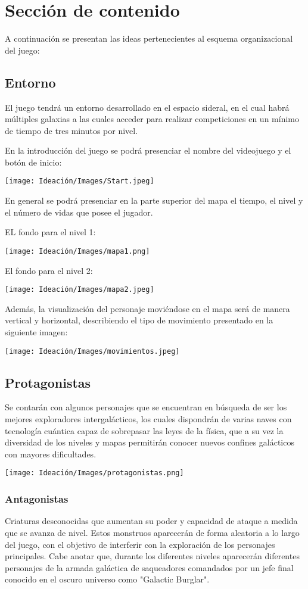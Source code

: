 \documentclass{article}
\begin{document}
\section{Sección de contenido} \label{contenido}
A continuación se presentan las ideas pertenecientes al esquema organizacional del juego:

\subsection{Entorno}
El juego tendrá un entorno desarrollado en el espacio sideral, en el cual habrá múltiples galaxias a las cuales acceder para realizar competiciones en un mínimo de tiempo de tres minutos por nivel. 

En la introducción del juego se podrá presenciar el nombre del videojuego y el botón de inicio:


\texttt{[image: Ideación/Images/Start.jpeg]}


En general se podrá presenciar en la parte superior del mapa el tiempo, el nivel y el número de vidas que posee el jugador. 

EL fondo para el nivel 1: 

\texttt{[image: Ideación/Images/mapa1.png]}

El fondo para el nivel 2:

\texttt{[image: Ideación/Images/mapa2.jpeg]}

Además, la visualización del personaje moviéndose en el mapa será de manera vertical y horizontal, describiendo el tipo de movimiento presentado en la siguiente imagen:  

\texttt{[image: Ideación/Images/movimientos.jpeg]}


\subsection{Protagonistas}
Se contarán con algunos personajes que se encuentran en búsqueda de ser los mejores exploradores intergalácticos, los cuales dispondrán de varias naves con tecnología cuántica capaz de sobrepasar las leyes de la física, que a su vez la diversidad de los niveles y mapas permitirán conocer nuevos confines galácticos con mayores dificultades. 

\texttt{[image: Ideación/Images/protagonistas.png]}

\subsubsection{Antagonistas}
Criaturas desconocidas que aumentan su poder y capacidad de ataque a medida que se avanza de nivel. Estos monstruos aparecerán de forma aleatoria a lo largo del juego, con el objetivo de interferir con la exploración de los personajes principales. Cabe anotar que, durante los diferentes niveles aparecerán diferentes personajes de la armada galáctica de saqueadores comandados por un jefe final conocido en el oscuro universo como "Galactic Burglar". 
\end{document}
